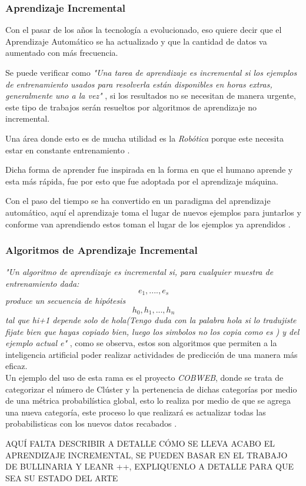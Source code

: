  \subsubsection{Aprendizaje Incremental}
        Con el pasar de los años la tecnología a evolucionado, eso quiere decir que el Aprendizaje Automático se ha actualizado y que la 
        cantidad de datos va aumentado con más frecuencia.
        
        Se puede verificar como \textit{"Una tarea de aprendizaje es incremental si los ejemplos de entrenamiento usados para 
        resolverla están disponibles en horas extras, generalmente uno a la vez"} \cite{GiraudCarrier2000}, si los resultados no se 
        necesitan de manera urgente, este tipo de trabajos serán resueltos por algoritmos de aprendizaje no incremental. 

        Una área donde esto es de mucha utilidad es la \textit{Rob\'otica} porque este necesita estar en constante entrenamiento \cite{GiraudCarrier2000}.

        Dicha forma de aprender fue inspirada en la forma en que el humano aprende y esta más rápida, fue por esto que fue adoptada 
        por el aprendizaje m\'aquina.

        Con el paso del tiempo se ha convertido en un paradigma del aprendizaje automático, aquí el aprendizaje toma el lugar de nuevos ejemplos para juntarlos 
        y conforme van aprendiendo estos toman el lugar de los ejemplos ya aprendidos \cite{liu2015}.

        \subsubsection{Algoritmos de Aprendizaje Incremental}
            \textit{"Un algoritmo de aprendizaje es incremental si,
            para cualquier muestra de entrenamiento dada:
            \begin{equation}
                e_{1} , .... , e_{s}
			\end{equation}
            produce un secuencia de hipótesis 
            \begin{equation}
                h_{0} , h_{1}, . . . , h_{n} 
            \end{equation}
            tal que hi+1 depende solo de hola(Tengo duda con la palabra hola si lo tradujiste fijate bien que hayas copiado bien, luego los simbolos no los copia como es ) y del ejemplo actual e"} \cite{GiraudCarrier2000}, como se 
            observa, estos son algoritmos que permiten a la inteligencia artificial poder realizar actividades de predicci\'on 
            de una manera m\'as eficaz.\\
            Un ejemplo del uso de esta rama es el proyecto \textit{COBWEB}, donde se trata de categorizar el n\'umero de Cl\'uster y la pertenencia 
            de dichas categor\'ias por medio de una m\'etrica probabil\'istica global, esto lo realiza por medio de que se agrega 
            una nueva categor\'ia, este proceso lo que realizar\'a es actualizar todas las probabilisticas con los nuevos datos recabados \cite{fisher1987}.


AQUÍ FALTA DESCRIBIR A DETALLE CÓMO SE LLEVA ACABO EL APRENDIZAJE INCREMENTAL, SE PUEDEN BASAR EN EL TRABAJO DE BULLINARIA Y LEANR ++, EXPLIQUENLO A DETALLE PARA QUE SEA SU ESTADO DEL ARTE

